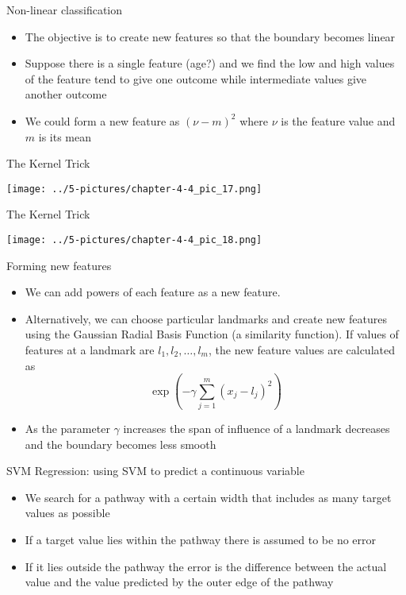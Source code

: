 \documentclass[11pt]{beamer}
\begin{document}
\begin{frame}{Non-linear classification}
	\begin{itemize}
		\item The objective is to create new features so that the boundary becomes linear
		\item Suppose there is a single feature (age?) and we find the low and high values of the feature tend to give one outcome while intermediate values give another outcome
		\item We could form a new feature as $(\nu-m)^2$ where $\nu$ is the feature value and $m$ is its mean
	\end{itemize}
\end{frame}
\begin{frame}{The Kernel Trick}
	\begin{center}
	\texttt{[image: ../5-pictures/chapter-4-4\_pic\_17.png]}
	\end{center}
\end{frame}
\begin{frame}{The Kernel Trick}
	\begin{center}
	\texttt{[image: ../5-pictures/chapter-4-4\_pic\_18.png]}
	\end{center}
\end{frame}
\begin{frame}{Forming new features}
	\begin{itemize}
		\item We can add powers of each feature as a new feature.
		\item Alternatively, we can choose particular landmarks and create new features using the Gaussian Radial Basis Function (a similarity function). If values of features at a landmark are $l_1, l_2, \dots, l_m$, the new feature values are calculated as $$\exp\left(-\gamma \sum\limits_{j=1}^m (x_j - l_j)^2 \right)$$
		\item As the parameter $\gamma$ increases the span of influence of a landmark decreases  and the boundary becomes less smooth
	\end{itemize}
\end{frame}
\begin{frame}{SVM Regression: using SVM to predict a continuous variable}
	\begin{itemize}
		\item We search for a pathway with a certain width that includes as many target values as possible
		\item If a target value lies within the pathway there is assumed to be no error
		\item If it lies outside the pathway the error is the difference between the actual value and the value predicted by the outer edge of the pathway 
	\end{itemize}
\end{frame}
\end{document}
